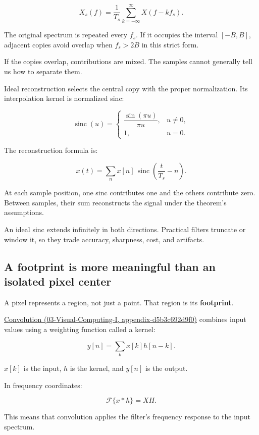 \[
X_s(f)=\frac1{T_s}
\sum_{k=-\infty}^{\infty}X(f-kf_s).
\]

The original spectrum is repeated every \(f_s\). If it occupies the interval \([-B,B]\), adjacent copies avoid overlap when \(f_s>2B\) in this strict form.

If the copies overlap, contributions are mixed. The samples cannot generally tell us how to separate them.

Ideal reconstruction selects the central copy with the proper normalization. Its interpolation kernel is normalized sinc:

\[
\operatorname{sinc}(u)=
\begin{cases}
\dfrac{\sin(\pi u)}{\pi u},&u\ne0,\\
1,&u=0.
\end{cases}
\]

The reconstruction formula is:

\[
x(t)=\sum_n x[n]\,
\operatorname{sinc}\left(\frac{t}{T_s}-n\right).
\]

At each sample position, one sinc contributes one and the others contribute zero. Between samples, their sum reconstructs the signal under the theorem's assumptions.

An ideal sinc extends infinitely in both directions. Practical filters truncate or window it, so they trade accuracy, sharpness, cost, and artifacts.

\subsection{A footprint is more meaningful than an isolated pixel center}\label{04-visual-computing-ii-ch043-a-footprint-is-more-meaningful-than-an-isolated-pixel-center}

A pixel represents a region, not just a point. That region is its \textbf{footprint}.

\href{../03-Visual-Computing-I/main.pdf\#nameddest=appendix-d5b3c692d9f0}{Convolution (03-Visual-Computing-I, appendix-d5b3c692d9f0)} combines input values using a weighting function called a kernel:

\[
y[n]=\sum_k x[k]h[n-k].
\]

\(x[k]\) is the input, \(h\) is the kernel, and \(y[n]\) is the output.

In frequency coordinates:

\[
\mathcal F\{x*h\}=XH.
\]

This means that convolution applies the filter's frequency response to the input spectrum.

